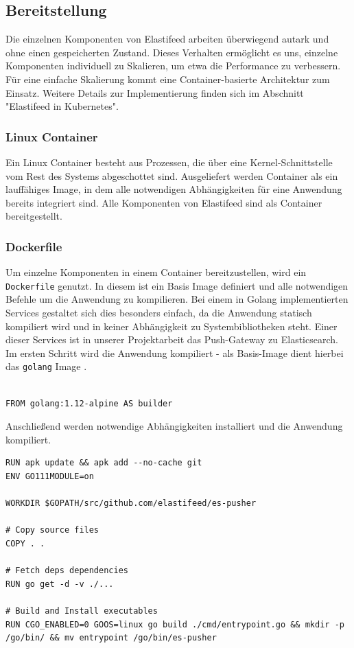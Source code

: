 \subsection{Bereitstellung}
Die einzelnen Komponenten von Elastifeed arbeiten überwiegend autark und ohne einen gespeicherten Zustand.
Dieses Verhalten ermöglicht es uns, einzelne Komponenten individuell zu Skalieren, um etwa die Performance zu verbessern.
Für eine einfache Skalierung kommt eine Container-basierte Architektur zum Einsatz.
Weitere Details zur Implementierung finden sich im Abschnitt "Elastifeed in Kubernetes".

\subsubsection{Linux Container}
Ein Linux Container besteht aus Prozessen, die über eine Kernel-Schnittstelle vom Rest des Systems abgeschottet sind. Ausgeliefert werden Container als ein lauffähiges Image, in dem alle notwendigen Abhängigkeiten für eine Anwendung bereits integriert sind.
Alle Komponenten von Elastifeed sind als Container bereitgestellt.

\subsubsection{Dockerfile}
Um einzelne Komponenten in einem Container bereitzustellen, wird ein \texttt{Dockerfile} genutzt.
In diesem ist ein Basis Image definiert und alle notwendigen Befehle um die Anwendung zu kompilieren.
Bei einem in Golang implementierten Services gestaltet sich dies besonders einfach, da die Anwendung statisch kompiliert wird und in keiner Abhängigkeit zu Systembibliotheken steht.
Einer dieser Services ist in unserer Projektarbeit das Push-Gateway zu Elasticsearch.
Im ersten Schritt wird die Anwendung kompiliert - als Basis-Image dient hierbei das \texttt{golang} Image \cite{god}.

\begin{verbatim}

FROM golang:1.12-alpine AS builder

\end{verbatim}

Anschließend werden notwendige Abhängigkeiten installiert und die Anwendung kompiliert.

\begin{verbatim}
RUN apk update && apk add --no-cache git
ENV GO111MODULE=on

WORKDIR $GOPATH/src/github.com/elastifeed/es-pusher

# Copy source files
COPY . .

# Fetch deps dependencies
RUN go get -d -v ./...

# Build and Install executables
RUN CGO_ENABLED=0 GOOS=linux go build ./cmd/entrypoint.go && mkdir -p /go/bin/ && mv entrypoint /go/bin/es-pusher
\end{verbatim}

